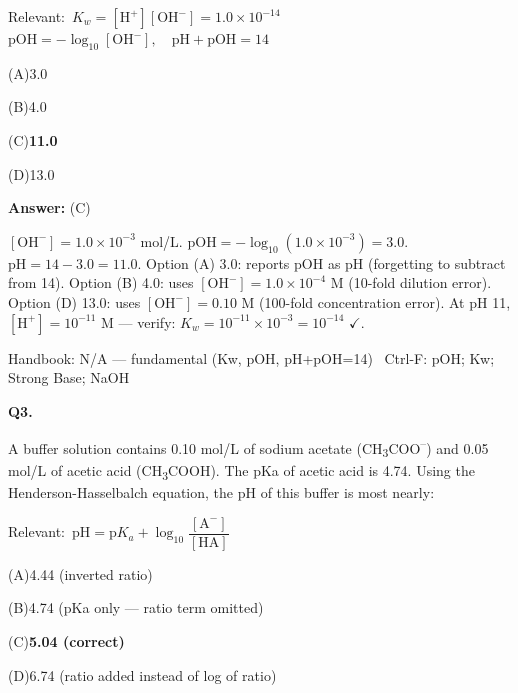 \documentclass[11pt]{article}
\newcommand{\correct}[1]{\textbf{#1}\;{\color{accent}$\checkmark$}}
\newcommand{\optline}[2]{\par\noindent\hspace{1.2em}(#1)\hspace{0.6em}#2}
\begin{document}
{\small\color{soft}Relevant:}\ $K_w = [\mathrm{H}^+][\mathrm{OH}^-] = 1.0\times10^{-14}$ \quad $\mathrm{pOH} = -\log_{10}[\mathrm{OH}^-],\quad \mathrm{pH} + \mathrm{pOH} = 14$\par\vspace{3pt}
\optline{A}{3.0}
\optline{B}{4.0}
\optline{C}{\correct{11.0}}
\optline{D}{13.0}
\par\vspace{3pt}
\vspace{2pt}\par\noindent\colorbox{boxbg}{\parbox{\dimexpr\linewidth-2\fboxsep\relax}{%
\vspace{2pt}\textbf{Answer:} (C)\par\vspace{2pt}
{\small $[\mathrm{OH}^-] = 1.0\times10^{-3}$ mol/L. $\mathrm{pOH} = -\log_{10}(1.0\times10^{-3}) = 3.0$. $\mathrm{pH} = 14 - 3.0 = 11.0$. Option (A) 3.0: reports pOH as pH (forgetting to subtract from 14). Option (B) 4.0: uses $[\mathrm{OH}^-] = 1.0\times10^{-4}$ M (10-fold dilution error). Option (D) 13.0: uses $[\mathrm{OH}^-] = 0.10$ M (100-fold concentration error). At pH 11, $[\mathrm{H}^+] = 10^{-11}$ M --- verify: $K_w = 10^{-11}\times10^{-3} = 10^{-14}$ $\checkmark$.}\par\vspace{2pt}
{\footnotesize\color{soft}Handbook: N/A --- fundamental (Kw, pOH, pH+pOH=14) \textbullet\ Ctrl-F: pOH; Kw; Strong Base; NaOH}\vspace{2pt}
}}
\vspace{9pt}
\filbreak
\textbf{\color{accent}Q3.}\par\vspace{2pt}
A buffer solution contains 0.10 mol/L of sodium acetate (CH\textsubscript{3}COO\textsuperscript{--}) and 0.05 mol/L of acetic acid (CH\textsubscript{3}COOH). The pKa of acetic acid is 4.74. Using the Henderson-Hasselbalch equation, the pH of this buffer is most nearly:\par\vspace{3pt}
{\small\color{soft}Relevant:}\ $\mathrm{pH} = \mathrm{p}K_a + \log_{10}\dfrac{[\mathrm{A}^-]}{[\mathrm{HA}]}$\par\vspace{3pt}
\optline{A}{4.44  (inverted ratio)}
\optline{B}{4.74  (pKa only --- ratio term omitted)}
\optline{C}{\correct{5.04  (correct)}}
\optline{D}{6.74  (ratio added instead of log of ratio)}
\par\vspace{3pt}
\end{document}
